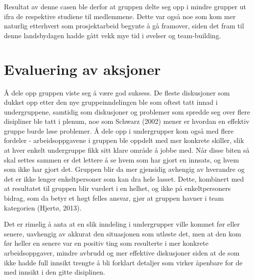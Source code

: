 Resultat av denne casen ble derfor at gruppen delte seg opp i mindre grupper ut ifra de respektive studiene til medlemmene. Dette var også noe som kom mer naturlig etterhvert som prosjektarbeid begynte å gå framover, siden det fram til denne landsbydagen hadde gått vekk mye tid i øvelser og team-building.

\section{Evaluering av aksjoner}
Å dele opp gruppen viste seg å være god suksess. De fleste diskusjoner som dukket opp etter den nye gruppeinndelingen ble som oftest tatt innad i undergruppene, samtidig som diskusjoner og problemer som spredde seg over flere disipliner ble tatt i plenum, noe som Schwarz (2002) mener er hvordan en effektiv gruppe burde løse problemer. Å dele opp i undergrupper kom også med flere fordeler - arbeidsoppgavene i gruppen ble oppdelt med mer konkrete skiller, slik at hver enkelt undergruppe fikk sitt klare område å jobbe med. Når disse biten så skal settes sammen er det lettere å se hvem som har gjort en innsats, og hvem som ikke har gjort det. Gruppen blir da mer gjensidig avhengig av hverandre og det er ikke lenger enkeltpersoner som kan dra hele lasset. Dette, kombinert med at resultatet til gruppen blir vurdert i en helhet, og ikke på enkeltpersoners bidrag, som da betyr et høgt felles ansvar, gjør at gruppen havner i team kategorien (Hjertø, 2013).

Det er rimelig å anta at en slik inndeling i undergrupper ville kommet før eller senere, uavhengig av akkurat den situasjonen som utløste det, men at den kom før heller en senere var en positiv ting som resulterte i mer konkrete arbeidsoppgaver, mindre avbrudd og mer effektive diskusjoner siden at de som ikke hadde full innsikt trengte å bli forklart detaljer som virker åpenbare for de med innsikt i den gitte disiplinen.